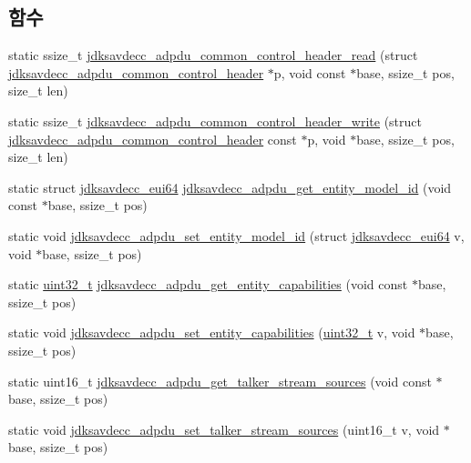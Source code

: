 \subsection*{함수}
\begin{DoxyCompactItemize}
\item 
static ssize\+\_\+t \hyperlink{group__adpdu_gaa014d2ff90974366a024dac5a4f04cac}{jdksavdecc\+\_\+adpdu\+\_\+common\+\_\+control\+\_\+header\+\_\+read} (struct \hyperlink{structjdksavdecc__adpdu__common__control__header}{jdksavdecc\+\_\+adpdu\+\_\+common\+\_\+control\+\_\+header} $\ast$p, void const $\ast$base, ssize\+\_\+t pos, size\+\_\+t len)
\item 
static ssize\+\_\+t \hyperlink{group__adpdu_ga6c65125a66fce45f38751f7c6731254d}{jdksavdecc\+\_\+adpdu\+\_\+common\+\_\+control\+\_\+header\+\_\+write} (struct \hyperlink{structjdksavdecc__adpdu__common__control__header}{jdksavdecc\+\_\+adpdu\+\_\+common\+\_\+control\+\_\+header} const $\ast$p, void $\ast$base, ssize\+\_\+t pos, size\+\_\+t len)
\item 
static struct \hyperlink{structjdksavdecc__eui64}{jdksavdecc\+\_\+eui64} \hyperlink{group__adpdu_ga25d17e8d5b3485c16ca7cba7595d2271}{jdksavdecc\+\_\+adpdu\+\_\+get\+\_\+entity\+\_\+model\+\_\+id} (void const $\ast$base, ssize\+\_\+t pos)
\item 
static void \hyperlink{group__adpdu_gaae7c3e50a01e59b2b1e67f9d5a276cb6}{jdksavdecc\+\_\+adpdu\+\_\+set\+\_\+entity\+\_\+model\+\_\+id} (struct \hyperlink{structjdksavdecc__eui64}{jdksavdecc\+\_\+eui64} v, void $\ast$base, ssize\+\_\+t pos)
\item 
static \hyperlink{parse_8c_a6eb1e68cc391dd753bc8ce896dbb8315}{uint32\+\_\+t} \hyperlink{group__adpdu_ga5de86e90ec004ac18d45c688b2a281fe}{jdksavdecc\+\_\+adpdu\+\_\+get\+\_\+entity\+\_\+capabilities} (void const $\ast$base, ssize\+\_\+t pos)
\item 
static void \hyperlink{group__adpdu_gababa29423e2e609fc7d4886a8aea177a}{jdksavdecc\+\_\+adpdu\+\_\+set\+\_\+entity\+\_\+capabilities} (\hyperlink{parse_8c_a6eb1e68cc391dd753bc8ce896dbb8315}{uint32\+\_\+t} v, void $\ast$base, ssize\+\_\+t pos)
\item 
static uint16\+\_\+t \hyperlink{group__adpdu_ga49981096210a18c343e4dae1f108ab28}{jdksavdecc\+\_\+adpdu\+\_\+get\+\_\+talker\+\_\+stream\+\_\+sources} (void const $\ast$base, ssize\+\_\+t pos)
\item 
static void \hyperlink{group__adpdu_ga8c9bda13234d80b2679aca9a06c05bd7}{jdksavdecc\+\_\+adpdu\+\_\+set\+\_\+talker\+\_\+stream\+\_\+sources} (uint16\+\_\+t v, void $\ast$base, ssize\+\_\+t pos)

\end{DoxyCompactItemize}
